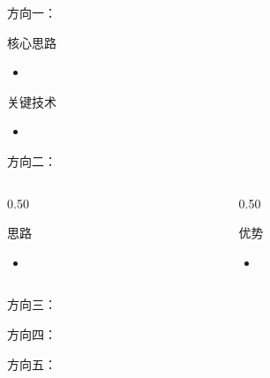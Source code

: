\documentclass[aspectratio=169, 8pt, UTF8]{ctexbeamer}
\begin{document}
\begin{frame}{方向一：\quad [标题]}
  \begin{block}{核心思路}
    \begin{itemize}
      \item
    \end{itemize}
  \end{block}

  \begin{exampleblock}{关键技术}
    \begin{itemize}
      \item
    \end{itemize}
  \end{exampleblock}
\end{frame}

\begin{frame}{方向二：\quad [标题]}
  \begin{columns}[T]
    \begin{column}{0.50\textwidth}
      \begin{block}{思路}
        \begin{itemize}
          \item
        \end{itemize}
      \end{block}
    \end{column}
    \begin{column}{0.50\textwidth}
      \begin{exampleblock}{优势}
        \begin{itemize}
          \item
        \end{itemize}
      \end{exampleblock}
    \end{column}
  \end{columns}
\end{frame}

\begin{frame}{方向三：\quad [标题]}
\end{frame}

\begin{frame}{方向四：\quad [标题]}
\end{frame}

\begin{frame}{方向五：\quad [标题]}
\end{frame}
\end{document}
